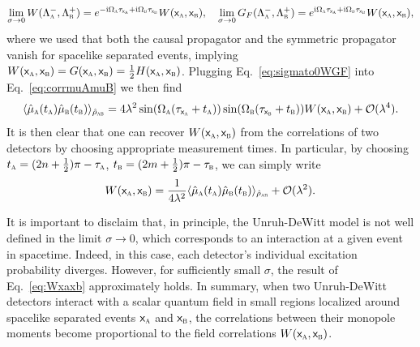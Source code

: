 \documentclass[letterpaper,12pt,titlepage,oneside,final]{book}
\newcommand{\mf}{\mathsf}%
\newcommand{\ii}{\mathrm{i}}
\renewcommand{\r}{\hat{\rho}}
\newcommand{\tc}[1]{\textsc{#1}}
\begin{document}
    \begin{align}\label{eq:sigmato0WGF}
        \lim_{\sigma\to 0} W(\Lambda_\tc{a}^-,\Lambda_\tc{b}^+) = e^{- \ii \Omega_\tc{a} \tau_{\mf x_\tc{a}} + \ii \Omega_\tc{b} \tau_{\mf x_\tc{b}}}W(\mf x_\tc{a},\mf x_\tc{b}),\quad 
        \lim_{\sigma\to 0} G_F(\Lambda_\tc{a}^-,\Lambda_\tc{b}^+) = e^{\ii \Omega_\tc{a} \tau_{\mf x_\tc{a}} + \ii \Omega_\tc{b} \tau_{\mf x_\tc{b}}}W(\mf x_\tc{a},\mf x_\tc{b}),
    \end{align}
    where we used that both the causal propagator and the symmetric propagator vanish for spacelike separated events, implying $W(\mf x_\tc{a},\mf x_\tc{b}) = G(\mf x_\tc{a},\mf x_\tc{b}) = \tfrac{1}{2}H(\mf x_\tc{a},\mf x_\tc{b})$. Plugging Eq.~\eqref{eq:sigmato0WGF} into Eq.~\eqref{eq:corrmuAmuB} we then find
    \begin{align}
        \langle \hat{\mu}_\tc{a}(t_\tc{a}) \hat{\mu}_\tc{b}(t_\tc{b})\rangle_{\r_{\tc{ab}}} = 4\lambda^2 \sin(\Omega_\tc{a}(\tau_{\mf x_\tc{a}} + t_\tc{a}))\sin(\Omega_\tc{b}(\tau_{\mf x_\tc{b}} +t_\tc{b})) W(\mf x_\tc{a}, \mf x_\tc{b}) + \mathcal{O}(\lambda^4).
    \end{align}
    It is then clear that one can recover $W(\mf x_\tc{a},\mf x_\tc{b})$ from the correlations of two detectors by choosing appropriate measurement times. In particular, by choosing $t_\tc{a} = (2n+\frac{1}{2})\pi - \tau_\tc{a}$, $t_\tc{b} = (2m+\frac{1}{2})\pi - \tau_\tc{b}$, we can simply write
    \begin{equation}\label{eq:Wxaxb}
        W(\mf x_\tc{a}, \mf x_\tc{b}) = \frac{1}{4 \lambda^2} \langle \hat{\mu}_\tc{a}(t_\tc{a}) \hat{\mu}_\tc{b}(t_\tc{b})\rangle_{\r_{\tc{ab}}} + \mathcal{O}(\lambda^2).
    \end{equation}

    It is important to disclaim that, in principle, the Unruh-DeWitt model is not well defined in the limit $\sigma\to 0$, which corresponds to an interaction at a given event in spacetime. Indeed, in this case, each detector's individual excitation probability diverges. However, for sufficiently small $\sigma$, the result of Eq.~\eqref{eq:Wxaxb} approximately holds. In summary, when two Unruh-DeWitt detectors interact with a scalar quantum field in small regions localized around spacelike separated events $\mf x_\tc{a}$ and $\mf x_\tc{b}$, the correlations between their monopole moments become proportional to the field correlations $W(\mf x_\tc{a}, \mf x_\tc{b})$.
\end{document}
